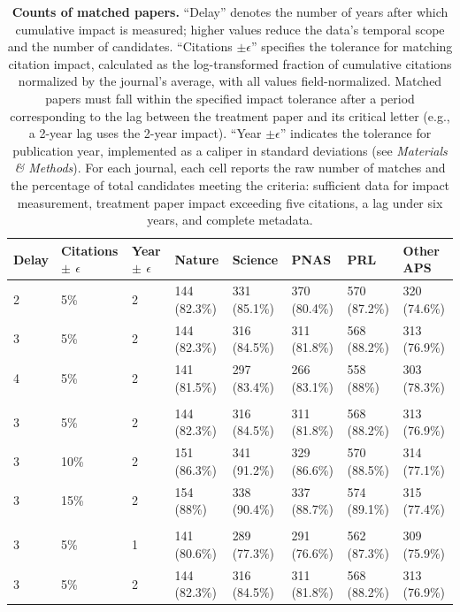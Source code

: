 \documentclass[12pt]{article} %
\def\methods{\textit{Materials \& Methods}}
\begin{document}
%
%
%
\clearpage
\begin{table}[p]
\small
\centering
\caption{
\textbf{Counts of matched papers.} 
``Delay'' denotes the number of years after which cumulative impact is measured; higher values reduce the data's temporal scope and the number of candidates. 
``Citations $\pm \epsilon$'' specifies the tolerance for matching citation impact, calculated as the log-transformed fraction of cumulative citations normalized by the journal's average, with all values field-normalized. 
Matched papers must fall within the specified impact tolerance after a period corresponding to the lag between the treatment paper and its critical letter (e.g., a 2-year lag uses the 2-year impact). 
``Year $\pm \epsilon$'' indicates the tolerance for publication year, implemented as a caliper in standard deviations (see \methods). 
For each journal, each cell reports the raw number of matches and the percentage of total candidates meeting the criteria: sufficient data for impact measurement, treatment paper impact exceeding five citations, a lag under six years, and complete metadata. 
}
\label{si:tab:paper-matched-counts}
\begin{tabular}{llllllll}
\toprule
Delay & Citations $\pm$ $\epsilon$ & Year $\pm$ $\epsilon$ & Nature & Science & PNAS & PRL & Other APS \\ 
  \midrule
2 & 5\% & 2 & 144 (82.3\%) & 331 (85.1\%) & 370 (80.4\%) & 570 (87.2\%) & 320 (74.6\%) \\ 
  3 & 5\% & 2 & 144 (82.3\%) & 316 (84.5\%) & 311 (81.8\%) & 568 (88.2\%) & 313 (76.9\%) \\ 
  4 & 5\% & 2 & 141 (81.5\%) & 297 (83.4\%) & 266 (83.1\%) & 558 (88\%) & 303 (78.3\%) \\ 
   &  &  &  &  &  &  &  \\ 
  3 & 5\% & 2 & 144 (82.3\%) & 316 (84.5\%) & 311 (81.8\%) & 568 (88.2\%) & 313 (76.9\%) \\ 
  3 & 10\% & 2 & 151 (86.3\%) & 341 (91.2\%) & 329 (86.6\%) & 570 (88.5\%) & 314 (77.1\%) \\ 
  3 & 15\% & 2 & 154 (88\%) & 338 (90.4\%) & 337 (88.7\%) & 574 (89.1\%) & 315 (77.4\%) \\ 
   &  &  &  &  &  &  &  \\ 
  3 & 5\% & 1 & 141 (80.6\%) & 289 (77.3\%) & 291 (76.6\%) & 562 (87.3\%) & 309 (75.9\%) \\ 
  3 & 5\% & 2 & 144 (82.3\%) & 316 (84.5\%) & 311 (81.8\%) & 568 (88.2\%) & 313 (76.9\%) \\ 
   \bottomrule
\end{tabular}
\end{table}
\end{document}
